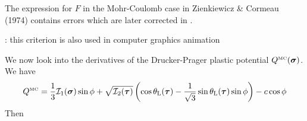 \begin{remark}
The expression for $F$ in the Mohr-Coulomb case in Zienkiewicz \& Cormeau (1974) \cite{zico74} 
contains errors which are later corrected in \textcite[p102]{book_zitf}. 
\end{remark}

\Literature: this criterion is also used in computer graphics animation \cite{zhbr05}




\vspace{.5cm}

We now look into the derivatives of the Drucker-Prager plastic potential $Q^{\text{\tiny MC}}(\bm\sigma)$.
We have
\[
Q^{\text{\tiny MC}}=
\frac{1}{3} {\cal I}_1({\bm \sigma}) \sin \phi  + 
\sqrt{  {\cal I}_2({\bm \tau})  } \left(\cos\theta_{\rm L}(\bm\tau)-\frac{1}{\sqrt{3}} 
\sin\theta_{\rm L} (\bm\tau) \sin\phi \right) -c \cos \phi
\]
Then

